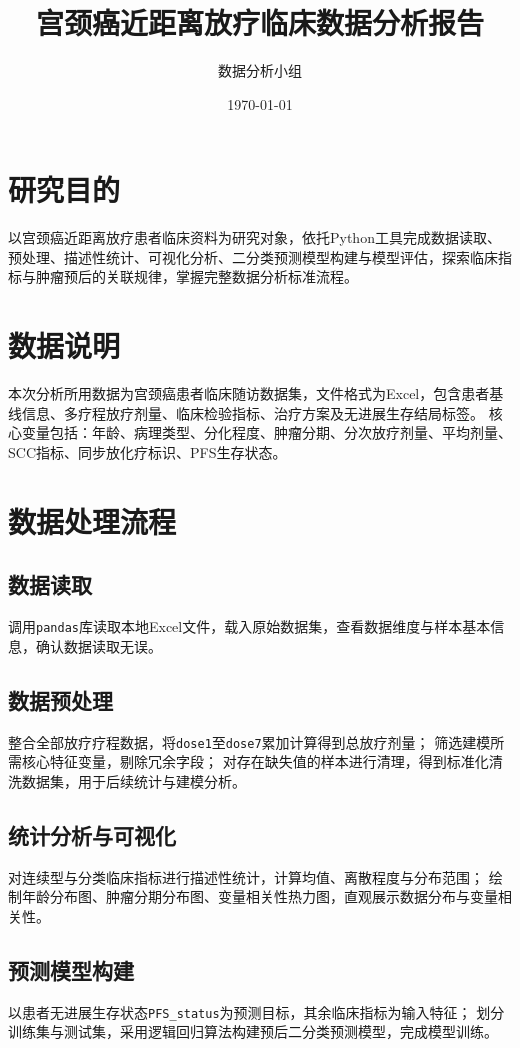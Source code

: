 \documentclass[12pt,a4paper]{article}
\begin{document}
\title{宫颈癌近距离放疗临床数据分析报告}
\author{数据分析小组}
\date{\today}
\maketitle

\section{研究目的}
以宫颈癌近距离放疗患者临床资料为研究对象，依托Python工具完成数据读取、预处理、描述性统计、可视化分析、二分类预测模型构建与模型评估，探索临床指标与肿瘤预后的关联规律，掌握完整数据分析标准流程。

\section{数据说明}
本次分析所用数据为宫颈癌患者临床随访数据集，文件格式为Excel，包含患者基线信息、多疗程放疗剂量、临床检验指标、治疗方案及无进展生存结局标签。
核心变量包括：年龄、病理类型、分化程度、肿瘤分期、分次放疗剂量、平均剂量、SCC指标、同步放化疗标识、PFS生存状态。

\section{数据处理流程}
\subsection{数据读取}
调用\texttt{pandas}库读取本地Excel文件，载入原始数据集，查看数据维度与样本基本信息，确认数据读取无误。

\subsection{数据预处理}
整合全部放疗疗程数据，将\texttt{dose1}至\texttt{dose7}累加计算得到总放疗剂量；
筛选建模所需核心特征变量，剔除冗余字段；
对存在缺失值的样本进行清理，得到标准化清洗数据集，用于后续统计与建模分析。

\subsection{统计分析与可视化}
对连续型与分类临床指标进行描述性统计，计算均值、离散程度与分布范围；
绘制年龄分布图、肿瘤分期分布图、变量相关性热力图，直观展示数据分布与变量相关性。

\subsection{预测模型构建}
以患者无进展生存状态\texttt{PFS\_status}为预测目标，其余临床指标为输入特征；
划分训练集与测试集，采用逻辑回归算法构建预后二分类预测模型，完成模型训练。
\end{document}
